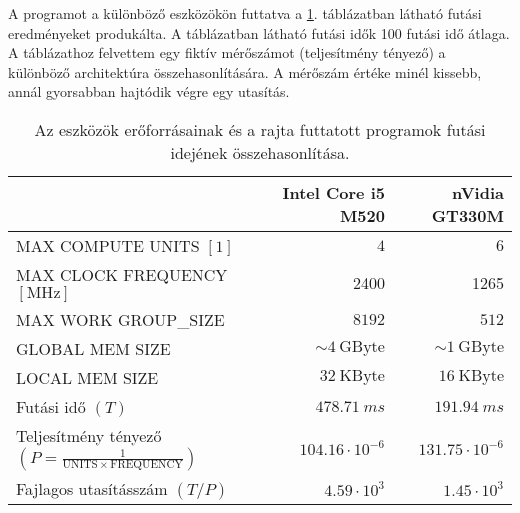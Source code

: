 	A programot a különböző eszközökön futtatva a \ref{table:results}. táblázatban látható futási
	eredményeket produkálta. A táblázatban látható futási idők 100 futási idő átlaga.
	A táblázathoz felvettem egy fiktív mérőszámot (teljesítmény tényező) a különböző architektúra
	összehasonlítására.
	A mérőszám értéke minél kissebb, annál gyorsabban hajtódik végre egy utasítás.
	\begin{table}[H]
	\footnotesize
	\centering
	\caption[Eszközök futási idejének összehasonlítása]{Az eszközök erőforrásainak és a rajta futtatott
	programok futási idejének összehasonlítása.}
	\label{table:results}
	\setlength{\extrarowheight}{8pt}
	\begin{tabular}{ l | r | r}
		 & Intel Core i5 M520 & nVidia GT330M \\ \hline
		MAX COMPUTE UNITS $[1]$ & $4$ & $6$\\
		MAX CLOCK FREQUENCY $[\mathrm{MHz}]$ & 2400 & 1265 \\
		MAX WORK GROUP\_SIZE & $8192$ & $512$ \\ \hline\hline
		GLOBAL MEM SIZE & $\sim 4\ \mathrm{GByte}$ & $\sim 1\ \mathrm{GByte}$\\
		LOCAL MEM SIZE & $32\ \mathrm{KByte}$ & $16\ \mathrm{KByte}$\\ \hline\hline
		Futási idő $(T)$ & $478.71\ ms$ & $191.94\ ms$\\
		Teljesítmény tényező $\left(P=\frac{1}{\mathrm{UNITS}\times \mathrm{FREQUENCY}}\right)$ &
		$104.16\cdot 10^{-6}$ & $131.75\cdot 10^{-6}$\\
		Fajlagos utasításszám $(T/P)$ &  $4.59\cdot 10^3$ & $1.45\cdot 10^3$ 
	\end{tabular}
	\end{table}
